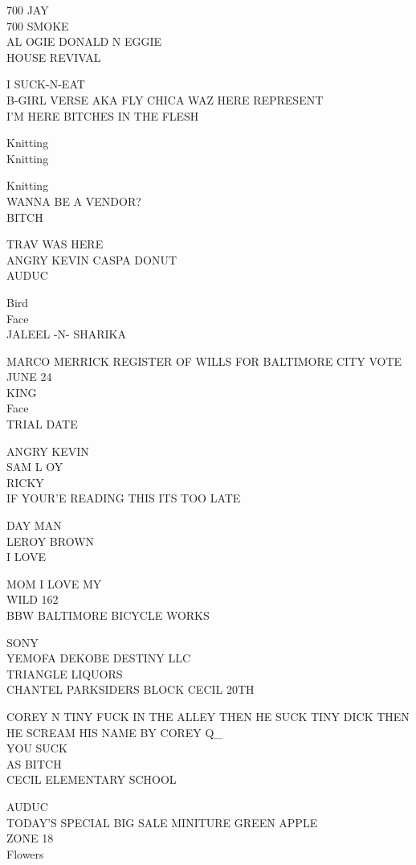 \documentclass[10pt,letterpaper]{article}
\begin{document}
700 JAY\\
700 SMOKE\\
AL OGIE DONALD N EGGIE\\
HOUSE REVIVAL

I SUCK{-}N{-}EAT\\
B{-}GIRL VERSE AKA FLY CHICA WAZ HERE REPRESENT\\
I'M HERE BITCHES IN THE FLESH

Knitting\\
Knitting

Knitting\\
WANNA BE A VENDOR?\\
BITCH

TRAV WAS HERE\\
ANGRY KEVIN CASPA DONUT\\
AUDUC

Bird\\
Face\\
JALEEL {-}N{-} SHARIKA

MARCO MERRICK REGISTER OF WILLS FOR BALTIMORE CITY VOTE JUNE 24\\
KING\\
Face\\
TRIAL DATE

ANGRY KEVIN\\
SAM L OY\\
RICKY\\
IF YOUR'E READING THIS ITS TOO LATE

DAY MAN\\
LEROY BROWN\\
I LOVE

MOM I LOVE MY\\
WILD 162\\
BBW BALTIMORE BICYCLE WORKS

SONY\\
YEMOFA DEKOBE DESTINY LLC\\
TRIANGLE LIQUORS\\
CHANTEL PARKSIDERS BLOCK CECIL 20TH

COREY N TINY FUCK IN THE ALLEY THEN HE SUCK TINY DICK THEN HE SCREAM HIS NAME BY COREY Q\_\\
YOU SUCK\\
AS BITCH\\
CECIL ELEMENTARY SCHOOL

AUDUC\\
TODAY'S SPECIAL BIG SALE MINITURE GREEN APPLE\\
ZONE 18\\
Flowers
\end{document}
